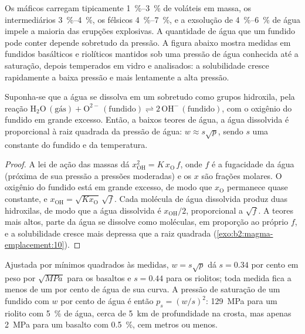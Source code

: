 Os  máficos carregam tipicamente \qtyrange{1}{3}{\percent} de voláteis em massa,
os  intermediários \qtyrange{3}{4}{\percent}, os  félsicos
\qtyrange{4}{7}{\percent}, e a exsolução de \qtyrange{4}{6}{\percent} de
água impele a maioria das erupções explosivas. A quantidade de água que um fundido pode conter depende
sobretudo da pressão. A figura abaixo mostra medidas em fundidos basálticos e
riolíticos mantidos sob uma pressão de água conhecida até a saturação, depois temperados
em vidro e analisados: a solubilidade cresce rapidamente a baixa pressão e mais
lentamente a alta pressão.

\begin{proposition}\label{prop:b2:magma-emplacement:sqrt}
Suponha-se que a água se dissolva em um  sobretudo como grupos hidroxila, pela
reação $\mathrm{H_2O\,(\text{gás})} + \mathrm{O^{2-}\,(fundido)} \rightleftharpoons
2\,\mathrm{OH^-\,(fundido)}$, com o oxigênio do fundido em grande excesso. Então, a
baixos teores de água, a água dissolvida é proporcional à raiz quadrada da
pressão de água: $w \approx s\sqrt{p}$, sendo $s$ uma constante do fundido e da
temperatura.
\end{proposition}

\begin{proof}
A lei de ação das massas dá $x_{\mathrm{OH}}^2 = K\,x_{\mathrm{O}}\,f$, onde $f$ é
a fugacidade da água (próxima de sua pressão a pressões moderadas) e os $x$
são frações molares. O oxigênio do fundido está em grande excesso, de modo que
$x_{\mathrm{O}}$ permanece quase constante, e $x_{\mathrm{OH}} = \sqrt{Kx_{\mathrm{O}}}\,
\sqrt f$. Cada molécula de água dissolvida produz duas hidroxilas, de modo que a água
dissolvida é $x_{\mathrm{OH}}/2$, proporcional a $\sqrt f$. A teores mais altos, parte
da água se dissolve como moléculas, em proporção ao próprio $f$, e a
solubilidade cresce mais depressa que a raiz quadrada (\cref{exo:b2:magma-emplacement:10}).
\end{proof}

Ajustada por mínimos quadrados às medidas, $w = s\sqrt p$ dá
$s = 0.34$ por cento em peso por $\sqrt{\unit{MPa}}$ para os basaltos e
$s = 0.44$ para os riolitos; toda medida fica a menos de um por cento de
água de sua curva. A pressão de saturação de um fundido com $w$ por cento
de água é então $p_s = (w/s)^2$: \qty{129}{MPa} para um riolito com
\qty{5}{\percent} de água, cerca de \qty{5}{km} de profundidade na crosta, mas apenas
\qty{2}{MPa} para um basalto com \qty{0.5}{\percent}, cem metros ou menos.

